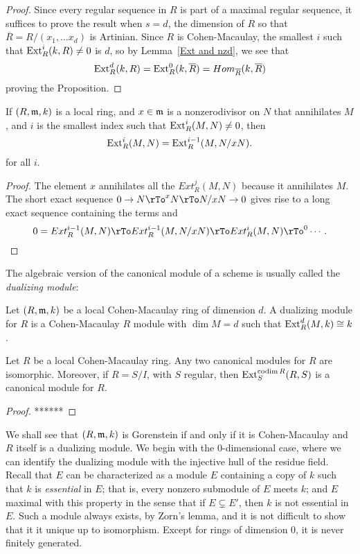 \begin{proof}
Since every regular sequence in $R$ is part of a maximal regular sequence, it suffices to prove the result when $s = d$, the dimension of $R$ so that $\overline R = R/(x_{1}, \dots x_{d})$ is Artinian. Since $R$ is Cohen-Macaulay, the smallest $i$ such that 
$\Ext_{R}^{i}(k, R) \neq 0$ is $d$, so by Lemma~\ref{Ext and nzd}, we see that 
$$
\Ext_{R}^{d}(k, R) = \Ext_{R}^{0}(k, \overline R) = Hom_{\overline R}(k,\overline R)
$$
proving the Proposition.
\end{proof}
\begin{lemma}\label{Ext and nzd}
 If $(R,\gm,k)$ is a local ring, and $x\in \gm$ is a nonzerodivisor on $N$ that annihilates $M$, and $i$ is the smallest index such that $ \Ext_R^{i}(M, N) \neq 0$, then
 $$
 \Ext_R^{i}(M, N) = \Ext_{R}^{i-1}(M, N/xN).
 $$
for all $i$. 
 \end{lemma}
\begin{proof}
The element $x$ annihilates all the $Ext^{j}_{R}(M,N)$ because it annihilates $M$. 
The short exact sequence $0\to N\rTo^{x}N \rTo N/xN \to 0$ gives rise to a long exact sequence containing the terms
and
$$
0 =  Ext_{R}^{i-1}(M,N) \rTo Ext_{R}^{i-1}(M,N/xN) \rTo Ext_{R}^{i}(M,N) \rTo^{0} \cdots.
$$
\end{proof}

The algebraic version of the canonical module of a scheme is usually called the \emph{dualizing module}:
\begin{definition}
 Let $(R, \gm, k)$ be a local Cohen-Macaulay ring of dimension $d$. A dualizing module for $R$ is a Cohen-Macaulay
 $R$ module with $\dim M = d$ such that $\Ext^{d}_{R}(M,k)\cong k$.
\end{definition}

\begin{proposition}
 Let $R$ be a local Cohen-Macaulay ring. Any two canonical modules for $R$ are isomorphic. Moreover,
 if $R = S/I$, with $S$ regular, then $\Ext_{S}^{\codim R}(R,S)$ is a canonical module for $R$.
\end{proposition}

\begin{proof}
 ******
\end{proof}

We shall see that $(R,\gm,k)$ is Gorenstein if and only if it is Cohen-Macaulay and 
$R$ itself is a dualizing module. We begin with the 0-dimensional case, where we can identify the dualizing module with the injective hull of the residue field. Recall that $E$ can be characterized as a module $E$ containing a copy of $k$ such that 
 $k$ is \emph{essential} in $E$; that is, every nonzero submodule of $E$ meets $k$; and
$E$ maximal with this property in the sense that if $E\subsetneq E'$, then $k$ is not essential
in $E$. Such a module always exists, by Zorn's lemma, and it is not difficult to show that it it unique up to isomorphism. Except for rings of dimension 0, it is never finitely generated.

